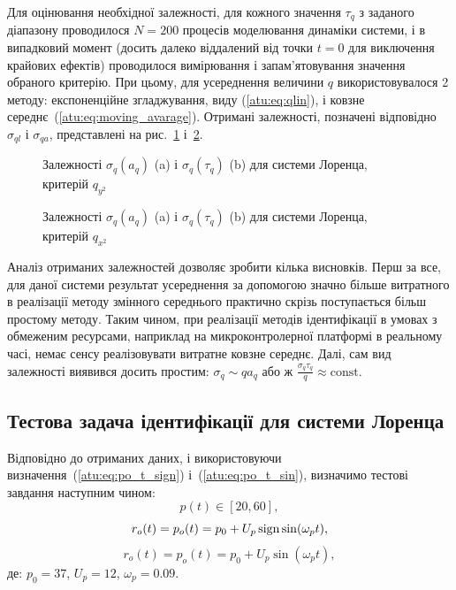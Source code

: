 Для оцінювання необхідної залежності, для кожного значення
$\tau_q$ з заданого діапазону проводилося
$N=200$ процесів моделювання динаміки системи, і в випадковий
момент (досить далеко віддалений від точки
$t=0$ для виключення крайових ефектів) проводилося вимірювання
і запам'ятовування значення обраного критерію. При цьому, для усереднення
величини
$q$ використовувалося 2 методу: експоненційне згладжування,
виду (\ref{atu:eq:qlin}), і ковзне середнє~(\ref{atu:eq:moving_avarage}). Отримані
залежності, позначені відповідно
$\sigma_{ql}$ і
$\sigma_{qa}$, представлені на рис.~\ref{atu:f:lor_qy2_tau} і~\ref{atu:f:lor_qx2_tau}.


\begin{figure}[htb!]
  \caption{Залежності $ \sigma_{q} (a_q) $ (a) і $ \sigma_{q} (\tau_q) $ (b) для системи Лоренца, критерій $q_{y^2}$}
\label{atu:f:lor_qy2_tau}
\end{figure}


\begin{figure}[htb!]
  \caption{Залежності $ \sigma_{q} (a_q) $ (a) і $ \sigma_{q} (\tau_q) $ (b) для системи Лоренца, критерій $q_{x^2}$}
\label{atu:f:lor_qx2_tau}
\end{figure}

Аналіз отриманих залежностей дозволяє зробити кілька
висновків. Перш за все, для даної системи результат усереднення
за допомогою значно більше витратного в реалізації
методу змінного середнього практично скрізь поступається
більш простому методу. Таким чином, при реалізації методів
ідентифікації в умовах з обмеженим ресурсами, наприклад на
микроконтролерної платформі в реальному часі, немає сенсу
реалізовувати витратне ковзне середнє. Далі, сам вид
залежності виявився досить простим:
$\sigma_q \sim q a_q $ або ж
$\frac{\sigma_q \tau_q}{q} \approx \mathrm{const}$.



\subsection{Тестова задача ідентифікації для системи Лоренца}%

Відповідно до отриманих даних, і використовуючи
визначення~(\ref{atu:eq:po_t_sign}) і~(\ref{atu:eq:po_t_sin}),
%
визначимо тестові завдання наступним чином:
\[
  p(t) \in [20, 60],
\]
%
\begin{equation}
  r_o(t) = p_o(t) = p_0 +  U_{p} \operatorname*{sign} \sin( \omega_{p} t ),
  \label{atu:eq:lor_po_t_sign}
\end{equation}
%
%
\begin{equation}
  r_o(t) = p_o(t) = p_0 +  U_{p} \sin( \omega_{p} t ),
  \label{atu:eq:lor_po_t_sin}
\end{equation}
%
де:
$p_0 = 37$, $U_p=12$, $\omega_p=0.09$.

